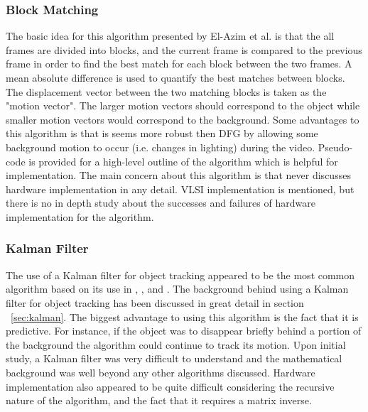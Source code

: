 \documentclass[12pt]{article} %
\begin{document}
\subsubsection{Block Matching}
The basic idea for this algorithm presented by El-Azim et al. \cite{5} is that the all frames are divided into blocks, and the current frame is compared to the previous frame in order to find the best match for each block between the two frames. A mean absolute difference is used to quantify the best matches between blocks. The displacement vector between the two matching blocks is taken as the "motion vector". The larger motion vectors should correspond to the object while smaller motion vectors would correspond to the background. Some advantages to this algorithm is that is seems more robust then DFG by allowing some background motion to occur (i.e. changes in lighting) during the video. Pseudo-code is provided for a high-level outline of the algorithm which is helpful for implementation. The main concern about this algorithm is that \cite{5} never discusses hardware implementation in any detail. VLSI implementation is mentioned, but there is no in depth study about the successes and failures of hardware implementation for the algorithm.
\subsubsection{Kalman Filter}
The use of a Kalman filter for object tracking appeared to be the most common algorithm based on its use in \cite{4}, \cite{7}, and \cite{9}. The background behind using a Kalman filter for object tracking has been discussed in great detail in section ~\ref{sec:kalman}. The biggest advantage to using this algorithm is the fact that it is predictive. For instance, if the object was to disappear briefly behind a portion of the background the algorithm could continue to track its motion. Upon initial study, a Kalman filter was very difficult to understand and the mathematical background was well beyond any other algorithms discussed. Hardware implementation also appeared to be quite difficult considering the recursive nature of the algorithm, and the fact that it requires a matrix inverse.
\end{document}
